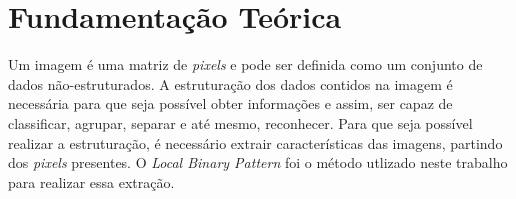 \documentclass[conference]{IEEEtran}
\begin{document}
%



\section{Fundamentação Teórica}
\label{sec_teoria}

Um imagem é uma matriz de \textit{pixels} e pode ser definida como um conjunto de dados não-estruturados. A estruturação dos dados contidos na imagem é necessária para que seja possível obter informações e assim, ser capaz de classificar, agrupar, separar e até mesmo, reconhecer. Para que seja possível realizar a estruturação, é necessário extrair características das imagens, partindo dos \textit{pixels} presentes. O \textit{Local Binary Pattern} foi o método utlizado neste trabalho para realizar essa extração.
\end{document}
